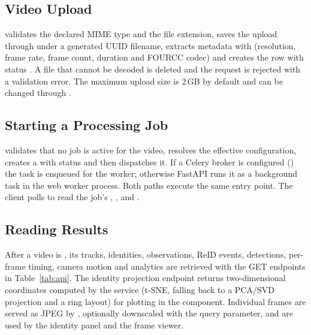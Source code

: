 \subsection{Video Upload}

 validates the declared MIME type and the file extension, saves the upload through  under a generated UUID filename, extracts metadata with  (resolution, frame rate, frame count, duration and FOURCC codec) and creates the  row with status . A file that cannot be decoded is deleted and the request is rejected with a validation error. The maximum upload size is 2\,GB by default and can be changed through .

\subsection{Starting a Processing Job}

 validates that no job is active for the video, resolves the effective configuration, creates a  with status  and then dispatches it. If a Celery broker is configured () the task is enqueued for the worker; otherwise FastAPI runs it as a background task in the web worker process. Both paths execute the same  entry point. The client polls  to read the job's , ,  and .


\subsection{Reading Results}

After a video is , its tracks, identities, observations, ReID events, detections, per-frame timing, camera motion and analytics are retrieved with the GET endpoints in Table~\ref{tab:api}. The identity projection endpoint returns two-dimensional coordinates computed by the  service (t-SNE, falling back to a PCA/SVD projection and a ring layout) for plotting in the  component. Individual frames are served as JPEG by , optionally downscaled with the  query parameter, and are used by the identity panel and the frame viewer.

